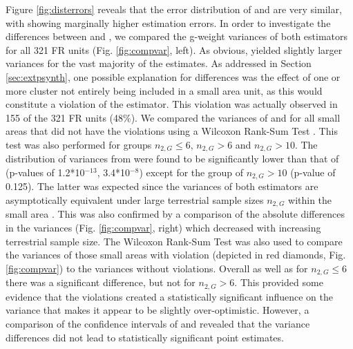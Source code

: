 Figure \ref{fig:disterrors} reveals that the error distribution of \psmall{} and \extpsynth{} are very similar, with \psmall{} showing marginally higher estimation errors. In order to investigate the differences between \psmall{} and \extpsynth{}, we compared the g-weight variances of both estimators for all 321 FR units (Fig. \ref{fig:compvar}, left). As obvious, \psmall{} yielded slightly larger variances for the vast majority of the estimates. As addressed in Section \ref{sec:extpsynth}, one possible explanation for differences was the effect of one or more cluster not entirely being included in a small area unit, as this would constitute a violation of the \extpsynth{} estimator. This violation was actually observed in 155 of the 321 FR units (48\%). We compared the variances of \psmall{} and \extpsynth{} for all small areas that did not have the violations using a Wilcoxon Rank-Sum Test \citep{wilcoxon1970}. This test was also performed for groups $n_{2,G} \leq 6$, $n_{2,G} > 6$ and $n_{2,G} > 10$. The distribution of variances from \extpsynth{} were found to be significantly lower than that of \psmall{} (p-values of 1.2*10$^{-13}$, 3.4*10$^{-8}$) except for the group of $n_{2,G} > 10$ (p-value of 0.125). The latter was expected since the variances of both estimators are asymptotically equivalent under large terrestrial sample sizes $n_{2,G}$ within the small area \citep[pp.17--18]{mandallaz2016}. This was also confirmed by a comparison of the absolute differences in the variances (Fig. \ref{fig:compvar}, right) which decreased with increasing terrestrial sample size. The Wilcoxon Rank-Sum Test was also used to compare the \extpsynth{} variances of those small areas with violation (depicted in red diamonds, Fig. \ref{fig:compvar}) to the \psmall{} variances without violations. Overall as well as for $n_{2,G} \leq 6$ there was a significant difference, but not for $n_{2,G} > 6$. This provided some evidence that the violations created a statistically significant influence on the \extpsynth{} variance that makes it appear to be slightly over-optimistic. However, a comparison of the confidence intervals of \psmall{} and \extpsynth{} revealed that the variance differences did not lead to statistically significant point estimates.\par

